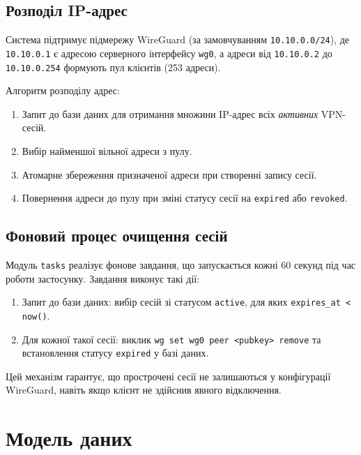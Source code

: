 \subsection{Розподіл IP-адрес}

Система підтримує підмережу WireGuard (за замовчуванням \texttt{10.10.0.0/24}),
де \texttt{10.10.0.1} є адресою серверного інтерфейсу \texttt{wg0}, а адреси
від \texttt{10.10.0.2} до \texttt{10.10.0.254} формують пул клієнтів
(253 адреси).

Алгоритм розподілу адрес:
\begin{enumerate}
  \item Запит до бази даних для отримання множини IP-адрес всіх
    \textit{активних} VPN-сесій.
  \item Вибір найменшої вільної адреси з пулу.
  \item Атомарне збереження призначеної адреси при створенні запису сесії.
  \item Повернення адреси до пулу при зміні статусу сесії на
    \texttt{expired} або \texttt{revoked}.
\end{enumerate}

\subsection{Фоновий процес очищення сесій}

Модуль \texttt{tasks} реалізує фонове завдання, що запускається кожні
60 секунд під час роботи застосунку. Завдання виконує такі дії:

\begin{enumerate}
  \item Запит до бази даних: вибір сесій зі статусом \texttt{active},
    для яких \texttt{expires\_at < now()}.
  \item Для кожної такої сесії: виклик \texttt{wg set wg0 peer <pubkey>
    remove} та встановлення статусу \texttt{expired} у базі даних.
\end{enumerate}

Цей механізм гарантує, що прострочені сесії не залишаються у
конфігурації WireGuard, навіть якщо клієнт не здійснив явного
відключення.

\section{Модель даних}
\label{sec:data_model}

